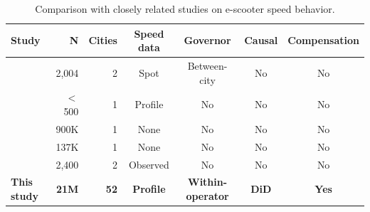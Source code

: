 \begin{table}[htbp]
\centering
\caption{Comparison with closely related studies on e-scooter speed behavior.}
\label{tab:lit_comparison}
\small
\begin{tabular}{lrrcccc}
\toprule
\textbf{Study} & \textbf{N} & \textbf{Cities} & \textbf{Speed data} & \textbf{Governor} & \textbf{Causal} & \textbf{Compensation} \\
\midrule
\citet{cicchino2023speed} & 2,004 & 2 & Spot & Between-city & No & No \\
\citet{ma2021escooter} & $<$500 & 1 & Profile & No & No & No \\
\citet{jiao2020shared} & 900K & 1 & None & No & No & No \\
\citet{mckenzie2019spatiotemporal} & 137K & 1 & None & No & No & No \\
\citet{neshagaran2024safety} & 2,400 & 2 & Observed & No & No & No \\
\addlinespace
\textbf{This study} & \textbf{21M} & \textbf{52} & \textbf{Profile} & \textbf{Within-operator} & \textbf{DiD} & \textbf{Yes} \\
\bottomrule
\end{tabular}
\end{table}
